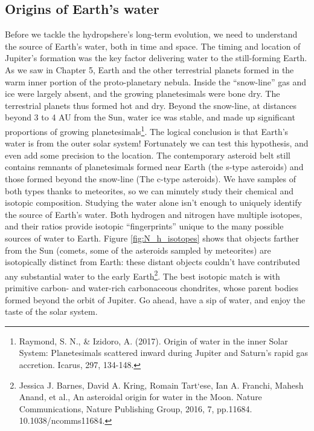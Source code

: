 {\subsection{Origins of Earth's water}
Before we tackle the hydropshere's long-term evolution, we need to understand the source of Earth's water, both in time and space. The timing and location of Jupiter's formation was the key factor delivering water to the still-forming Earth. As we saw in Chapter 5, Earth and the other terrestrial planets formed in the warm inner portion of the proto-planetary nebula. Inside the ``snow-line'' gas and ice were largely absent, and the growing planetesimals were bone dry. The terrestrial planets thus formed hot and dry. Beyond the snow-line, at distances beyond 3 to 4 AU from the Sun, water ice was stable, and made up significant proportions of growing planetesimals\footnote{Raymond, S. N., \& Izidoro, A. (2017). Origin of water in the inner Solar System: Planetesimals scattered inward during Jupiter and Saturn's rapid gas accretion. Icarus, 297, 134-148.}. The logical conclusion is that Earth's water is from the outer solar system! Fortunately we can test this hypothesis, and even add some precision to the location. The contemporary asteroid belt still contains remnants of planetesimals formed near Earth (the s-type asteroids) and those formed beyond the snow-line (The c-type asteroids). We have samples of both types thanks to meteorites, so we can minutely study their chemical and isotopic composition. Studying the water alone isn't enough to uniquely identify the source of Earth's water. Both hydrogen and nitrogen have multiple  isotopes, and their ratios provide isotopic ``fingerprints'' unique to the many possible sources of water to Earth. Figure \ref{fig:N_h_isotopes} shows that objects farther from the Sun (comets, some of the asteroids sampled by meteorites) are isotopically distinct from Earth: these distant objects couldn't have contributed any substantial water to the early Earth\footnote{Jessica J. Barnes, David A. Kring, Romain Tart`ese, Ian A. Franchi, Mahesh Anand, et al., An asteroidal origin for water in the Moon. Nature Communications, Nature Publishing Group, 2016, 7, pp.11684. 10.1038/ncomms11684.}. The best isotopic match is with primitive carbon- and water-rich carbonaceous chondrites, whose parent bodies formed beyond the orbit of Jupiter. Go ahead, have a sip of water, and enjoy the taste of the solar system.\\

}
